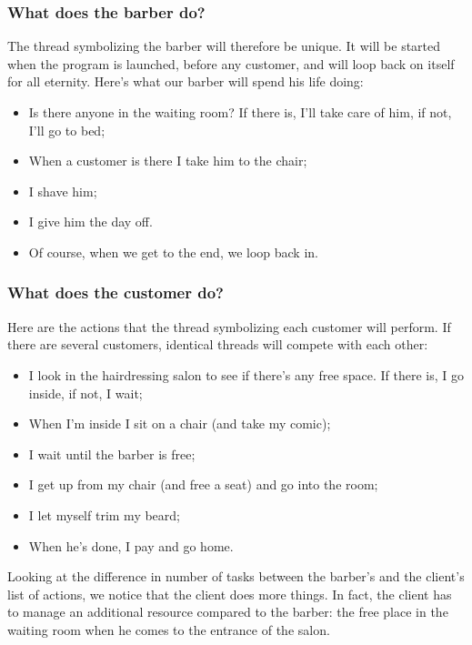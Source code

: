 \documentclass{article}
\begin{document}
\subsubsection{ What does the barber do?}
The thread symbolizing the barber will therefore be unique. It will be started when the program is launched, before any customer, and will loop back on itself for all eternity.
Here's what our barber will spend his life doing:

\begin{itemize}
    \item Is there anyone in the waiting room? If there is, I'll take care of him, if not, I'll go to bed;
    \item When a customer is there I take him to the chair;
    \item I shave him;
    \item I give him the day off.
    \item Of course, when we get to the end, we loop back in.
\end{itemize}

\subsubsection{ What does the customer do?}

Here are the actions that the thread symbolizing each customer will perform. If there are several customers, identical threads will compete with each other:

\begin{itemize}
    \item I look in the hairdressing salon to see if there's any free space. If there is, I go inside, if not, I wait;
    \item When I'm inside I sit on a chair (and take my comic);
    \item I wait until the barber is free;
    \item I get up from my chair (and free a seat) and go into the room;
    \item I let myself trim my beard;
    \item When he's done, I pay and go home.
\end{itemize}

Looking at the difference in number of tasks between the barber's and the client's list of actions, we notice that the client does more things. In fact, the client has to manage an additional resource compared to the barber: the free place in the waiting room when he comes to the entrance of the salon.
\end{document}

